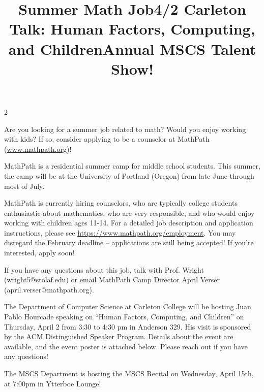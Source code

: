 \documentclass[12pt]{article}
\newcommand{\bolder}{\textbf}
\begin{document}
\begin{multicols}{2}
 \begin{tcolorbox}[colback=white, colframe=black]
    \begin{center}
    \title{{\large \bolder{Summer Math Job}}}
    \end{center}
\end{tcolorbox}
Are you looking for a summer job related to math? Would you enjoy working with kids? If so, consider applying to be a counselor at MathPath (\href{http://www.mathpath.org}{www.mathpath.org})!

MathPath is a residential summer camp for middle school students. This summer, the camp will be at the University of Portland (Oregon) from late June through most of July. 

MathPath is currently hiring counselors, who are typically college students enthusiastic about mathematics, who are very responsible, and who would enjoy working with children ages 11-14. For a detailed job description and application instructions, please see \href{https://www.mathpath.org/employment/counselors}{https://www.mathpath.org/employment}. You may disregard the February deadline -- applications are still being accepted! If you're interested, apply soon! 

If you have any questions about this job, talk with Prof. Wright (wright5@stolaf.edu) or email MathPath Camp Director April Verser (april.verser@mathpath.org).



 \begin{tcolorbox}[colback=white, colframe=black]
    \begin{center}
    \title{{\large \bolder{4/2 Carleton Talk: Human Factors, Computing, and Children}}}
    \end{center}
\end{tcolorbox}
The Department of Computer Science at Carleton College will be hosting Juan Pablo Hourcade speaking on “Human Factors, Computing, and Children” on Thursday, April 2 from 3:30 to 4:30 pm in Anderson 329. His visit is sponsored by the ACM Distinguished Speaker Program. Details about the event are available, and the event poster is attached below. Please reach out if you have any questions!

 \begin{tcolorbox}[colback=white, colframe=black]
    \begin{center}
    \title{{\large \bolder{Annual MSCS Talent Show!}}}
    \end{center}
\end{tcolorbox}
The MSCS Department is hosting the MSCS Recital on Wednesday, April 15th, at 7:00pm in Ytterboe Lounge!


\end{multicols}
\end{document}
